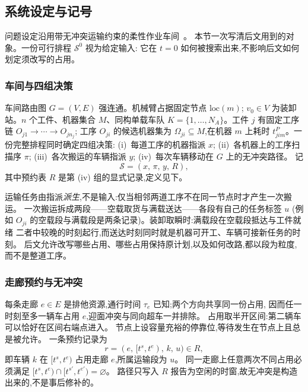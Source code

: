 \documentclass[manuscript,screen,review]{acmart}
\begin{document}
\subsection{系统设定与记号}
\label{sec:system_brief}

问题设定沿用带无冲突运输约束的柔性作业车间~\cite{vanos2026exact}。
本节一次写清后文用到的对象。一份可行排程 \(\mathcal{S}^0\) 视为给定输入:
它在 \(t=0\) 如何被搜索出来,不影响后文如何划定须改写的占用。

\subsubsection{车间与四组决策}
\label{sec:shop}

车间路由图 \(G=(V,E)\) 强连通。机械臂占据固定节点 \(\mathrm{loc}(m)\);
\(v_0\in V\) 为装卸站。\(n\) 个工件、机器集合 \(M\)、同构单载车队
\(K=\{1,\ldots,N_A\}\)。工件 \(j\) 有固定工序链 \(O_{j1}\to\cdots\to O_{jn_j}\);
工序 \(O_{ji}\) 的候选机器集为 \(\Omega_{ji}\subseteq M\),在机器 \(m\) 上耗时
\(t^P_{jim}\)。一份完整排程同时确定四组决策:
(i)~每道工序的机器指派 \(x\);
(ii)~各机器上的工序扫描序 \(\pi\);
(iii)~各次搬运的车辆指派 \(y\);
(iv)~每次车辆移动在 \(G\) 上的无冲突路径。
记
\[
\mathcal{S}=(x,\,\pi,\,y,\,R),
\]
其中预约表 \(R\) 是第 (iv) 组的显式记录,定义见下。

运输任务由指派\emph{派生},不是输入:仅当相邻两道工序不在同一节点时才产生一次搬运。
一次搬运拆成两段——空载取货与满载送达——各段有自己的任务标签 \(u\)
(例如 \(O_{ji}\) 的空载段与满载段是两条记录)。装卸取瞬时:满载段在空载段抵达与工件就绪
二者中较晚的时刻起行,而送达时刻同时就是机器可开工、车辆可接新任务的时刻。
后文允许改写哪些占用、哪些占用保持原计划,以及如何改路,都以段为粒度,而不是整道工序。

\subsubsection{走廊预约与无冲突}
\label{sec:reservation}

每条走廊 \(e\in E\) 是排他资源,通行时间 \(\tau_e\) 已知;两个方向共享同一份占用,
因而任一时刻至多一辆车占用 \(e\),迎面冲突与同向超车一并排除。
占用取半开区间:第二辆车可以恰好在区间右端点进入。
节点上设容量充裕的停靠位,等待发生在节点上且总是被允许。
一条预约记录为
\[
r=(e,\,[t^s,t^e),\,k,\,u)\in R,
\]
即车辆 \(k\) 在 \([t^s,t^e)\) 占用走廊 \(e\),所属运输段为 \(u\)。
同一走廊上任意两次不同占用必须满足
\([t^s,t^e)\cap[t^{s\prime},t^{e\prime})=\varnothing\)。
路径只写入 \(R\) 报告为空闲的时窗,故无冲突是构造出来的,不是事后修补的。
\end{document}
